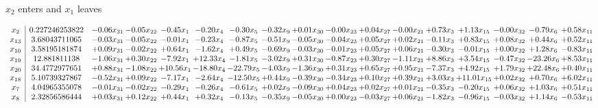 \documentclass[9pt]{article}
\begin{document}
 $ x_{2} $ enters and $ x_{1} $ leaves 

 \[\begin{array}{c| c c@{\hskip 2pt} c@{\hskip 2pt} c@{\hskip 2pt} c@{\hskip 2pt} c@{\hskip 2pt} c@{\hskip 2pt} c@{\hskip 2pt} c@{\hskip 2pt} c@{\hskip 2pt} c@{\hskip 2pt} c@{\hskip 2pt} c@{\hskip 2pt} c@{\hskip 2pt} c@{\hskip 2pt} c@{\hskip 2pt} }
 x_{2}   &  0.227246253822 & -0.06 x_{31} & -0.05 x_{22} & -0.45 x_{1} & -0.20 x_{4} & -0.30 x_{5} & -0.32 x_{9} & +  0.01 x_{30} & -0.00 x_{23} & +  0.04 x_{27} & -0.00 x_{21} & +  0.73 x_{3} & +  1.13 x_{15} & -0.00 x_{32} & -0.79 x_{6} & +  0.58 x_{11}\\
 x_{13}   &  3.68043711065 & -0.03 x_{31} & -0.05 x_{22} & -0.01 x_{1} & -0.23 x_{4} & -0.87 x_{5} & -0.51 x_{9} & -0.05 x_{30} & -0.04 x_{23} & +  0.05 x_{27} & +  0.02 x_{21} & -0.11 x_{3} & +  0.83 x_{15} & +  0.08 x_{32} & +  0.44 x_{6} & +  0.52 x_{11}\\
 x_{10}   &  3.58195181874 & +  0.09 x_{31} & -0.02 x_{22} & +  0.64 x_{1} & -1.62 x_{4} & +  0.49 x_{5} & -0.69 x_{9} & -0.03 x_{30} & -0.01 x_{23} & +  0.05 x_{27} & +  0.06 x_{21} & -0.30 x_{3} & -0.01 x_{15} & +  0.00 x_{32} & +  1.28 x_{6} & -0.83 x_{11}\\
 x_{19}   &  12.881811138 & -1.06 x_{31} & +  0.30 x_{22} & -7.92 x_{1} & + 12.33 x_{4} & -1.81 x_{5} & -3.02 x_{9} & +  0.31 x_{30} & -0.87 x_{23} & +  0.30 x_{27} & -1.11 x_{21} & +  8.86 x_{3} & +  3.54 x_{15} & -0.47 x_{32} & -23.26 x_{6} & +  8.53 x_{11}\\
 x_{20}   &  34.4772977651 & +  0.88 x_{31} & -1.08 x_{22} & + 10.56 x_{1} & -18.80 x_{4} & -22.79 x_{5} & -4.03 x_{9} & -1.36 x_{30} & +  0.31 x_{23} & +  0.65 x_{27} & +  0.95 x_{21} & -7.37 x_{3} & +  4.92 x_{15} & +  1.79 x_{32} & + 22.48 x_{6} & +  0.40 x_{11}\\
 x_{18}   &  5.10739327867 & -0.52 x_{31} & +  0.09 x_{22} & -7.17 x_{1} & -2.64 x_{4} & -12.50 x_{5} & +  0.44 x_{9} & -0.39 x_{30} & -0.34 x_{23} & +  0.10 x_{27} & +  0.39 x_{21} & +  3.03 x_{3} & + 11.01 x_{15} & +  0.02 x_{32} & +  0.70 x_{6} & +  6.02 x_{11}\\
 x_{7}   &  4.04965355078 & -0.01 x_{31} & -0.02 x_{22} & -0.29 x_{1} & -0.26 x_{4} & -0.61 x_{5} & +  0.02 x_{9} & -0.09 x_{30} & +  0.04 x_{23} & +  0.02 x_{27} & +  0.01 x_{21} & -0.35 x_{3} & -0.20 x_{15} & +  0.06 x_{32} & +  1.03 x_{6} & +  0.51 x_{11}\\
 x_{8}   &  2.32856586444 & +  0.03 x_{31} & +  0.12 x_{22} & +  0.44 x_{1} & +  0.32 x_{4} & -0.13 x_{5} & -0.35 x_{9} & -0.05 x_{30} & +  0.00 x_{23} & -0.03 x_{27} & +  0.06 x_{21} & -1.82 x_{3} & -0.96 x_{15} & -0.03 x_{32} & +  1.14 x_{6} & -0.53 x_{11}\\

\end{array}\]
\end{document}
